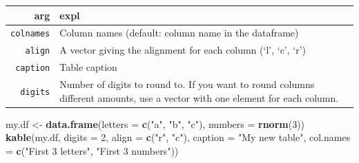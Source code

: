 \documentclass[]{book}
\makeatletter
\newenvironment{Shaded}{\begin{snugshade}}{\end{snugshade}}
\newcommand{\KeywordTok}[1]{\textcolor[rgb]{0.13,0.29,0.53}{\textbf{#1}}}
\newcommand{\DataTypeTok}[1]{\textcolor[rgb]{0.13,0.29,0.53}{#1}}
\newcommand{\DecValTok}[1]{\textcolor[rgb]{0.00,0.00,0.81}{#1}}
\newcommand{\StringTok}[1]{\textcolor[rgb]{0.31,0.60,0.02}{#1}}
\newcommand{\NormalTok}[1]{#1}
\newenvironment{kframe}{%
\medskip{}
\setlength{\fboxsep}{.8em}
 \def\at@end@of@kframe{}%
 \ifinner\ifhmode%
  \def\at@end@of@kframe{\end{minipage}}%
  \begin{minipage}{\columnwidth}%
 \fi\fi%
 \def\FrameCommand##1{\hskip\@totalleftmargin \hskip-\fboxsep
 \colorbox{shadecolor}{##1}\hskip-\fboxsep
     \hskip-\linewidth \hskip-\@totalleftmargin \hskip\columnwidth}%
 \MakeFramed {\advance\hsize-\width
   \@totalleftmargin\z@ \linewidth\hsize
   \@setminipage}}%
 {\par\unskip\endMakeFramed%
 \at@end@of@kframe}
\renewenvironment{Shaded}{\begin{kframe}}{\end{kframe}}
\theoremstyle{definition}
\theoremstyle{definition}
\theoremstyle{definition}
\theoremstyle{remark}
\makeatother
\begin{document}
\begin{longtable}[]{@{}rl@{}}
\toprule
\begin{minipage}[b]{0.17\columnwidth}\raggedleft\strut
arg\strut
\end{minipage} & \begin{minipage}[b]{0.68\columnwidth}\raggedright\strut
expl\strut
\end{minipage}\tabularnewline
\midrule
\endhead
\begin{minipage}[t]{0.17\columnwidth}\raggedleft\strut
\texttt{colnames}\strut
\end{minipage} & \begin{minipage}[t]{0.68\columnwidth}\raggedright\strut
Column names (default: column name in the dataframe)\strut
\end{minipage}\tabularnewline
\begin{minipage}[t]{0.17\columnwidth}\raggedleft\strut
\texttt{align}\strut
\end{minipage} & \begin{minipage}[t]{0.68\columnwidth}\raggedright\strut
A vector giving the alignment for each column (`l', `c', `r')\strut
\end{minipage}\tabularnewline
\begin{minipage}[t]{0.17\columnwidth}\raggedleft\strut
\texttt{caption}\strut
\end{minipage} & \begin{minipage}[t]{0.68\columnwidth}\raggedright\strut
Table caption\strut
\end{minipage}\tabularnewline
\begin{minipage}[t]{0.17\columnwidth}\raggedleft\strut
\texttt{digits}\strut
\end{minipage} & \begin{minipage}[t]{0.68\columnwidth}\raggedright\strut
Number of digits to round to. If you want to round columns different
amounts, use a vector with one element for each column.\strut
\end{minipage}\tabularnewline
\bottomrule
\end{longtable}

\begin{Shaded}
\begin{Highlighting}[]
\NormalTok{my.df <-}\StringTok{ }\KeywordTok{data.frame}\NormalTok{(}\DataTypeTok{letters =} \KeywordTok{c}\NormalTok{(}\StringTok{"a"}\NormalTok{, }\StringTok{"b"}\NormalTok{, }\StringTok{"c"}\NormalTok{),}
                \DataTypeTok{numbers =} \KeywordTok{rnorm}\NormalTok{(}\DecValTok{3}\NormalTok{))}
\KeywordTok{kable}\NormalTok{(my.df, }\DataTypeTok{digits =} \DecValTok{2}\NormalTok{, }\DataTypeTok{align =} \KeywordTok{c}\NormalTok{(}\StringTok{"r"}\NormalTok{, }\StringTok{"c"}\NormalTok{),}
      \DataTypeTok{caption =} \StringTok{"My new table"}\NormalTok{, }
      \DataTypeTok{col.names =} \KeywordTok{c}\NormalTok{(}\StringTok{"First 3 letters"}\NormalTok{, }
                    \StringTok{"First 3 numbers"}\NormalTok{))}
\end{Highlighting}
\end{Shaded}
\end{document}
